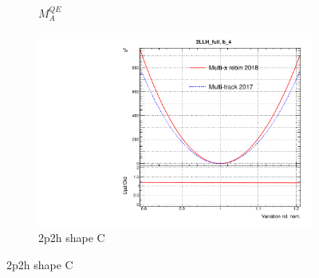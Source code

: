 \begin{figure}[h]
\begin{subfigure}[t]{0.32\textwidth}
		\caption{$M_A^{QE}$}
	\end{subfigure}
	\begin{subfigure}[t]{0.32\textwidth}
		\includegraphics[width=\textwidth,page=16, trim={0mm 0mm 0mm 9mm}, clip]{figures/mach3/2018/llh/MultiPi_vs_MultiTrack_TotalLLH_2017vs2018}
		\caption{2p2h shape C}
	\end{subfigure}
	

\end{figure}
